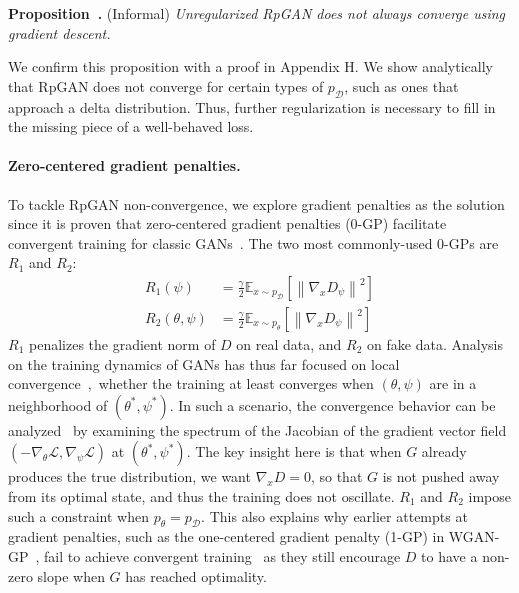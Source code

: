 \vspace{0.5ex}
\noindent \textbf{Proposition~.} (Informal) \emph{Unregularized RpGAN does not always converge using gradient descent.}
\vspace{0.5ex}

\noindent We confirm this proposition with a proof in Appendix H. 
We show analytically that RpGAN does not converge for certain types of $p_\mathcal{D}$, such as ones that approach a delta distribution. Thus, further regularization is necessary to fill in the missing piece of a well-behaved loss.

\vspace{-1.5ex}
\paragraph{Zero-centered gradient penalties.}
To tackle RpGAN non-convergence, we explore gradient penalties as the solution since it is proven that zero-centered gradient penalties (0-GP) facilitate convergent training for classic GANs~\cite{r1}. The two most commonly-used 0-GPs are $R_1$ and $R_2$:
\begin{equation}
\begin{aligned}
R_1(\psi)&=\frac{\gamma}{2}\mathbb{E}_{x\sim p_\mathcal{D}}\left[\left\| \nabla_x D_\psi \right \|^2\right]\\ 
R_2(\theta,\psi)&=\frac{\gamma}{2}\mathbb{E}_{x\sim p_\theta}\left[\left\| \nabla_x D_\psi \right \|^2\right]
\end{aligned}
\end{equation}
$R_1$ penalizes the gradient norm of $D$ on real data, and $R_2$ on fake data. Analysis on the training dynamics of GANs has thus far focused on local convergence~\cite{nagarajan2017gradient,gannum,r1},~\ie whether the training at least converges when $(\theta,\psi)$ are in a neighborhood of $(\theta^*,\psi^*)$. In such a scenario, the convergence behavior can be analyzed~\cite{nagarajan2017gradient,gannum,r1} by examining the spectrum of the Jacobian of the gradient vector field $\left(-\nabla_\theta\mathcal{L},\nabla_\psi\mathcal{L} \right )$ at $(\theta^*,\psi^*)$. The key insight here is that when $G$ already produces the true distribution, we want $\nabla_x D=0$, so that $G$ is not pushed away from its optimal state, and thus the training does not oscillate. $R_1$ and $R_2$ impose such a constraint when $p_\theta=p_\mathcal{D}$. This also explains why earlier attempts at gradient penalties, such as the one-centered gradient penalty (1-GP) in WGAN-GP~\cite{wgan-gp}, fail to achieve convergent training~\cite{r1} as they still encourage $D$ to have a non-zero slope when $G$ has reached optimality.


